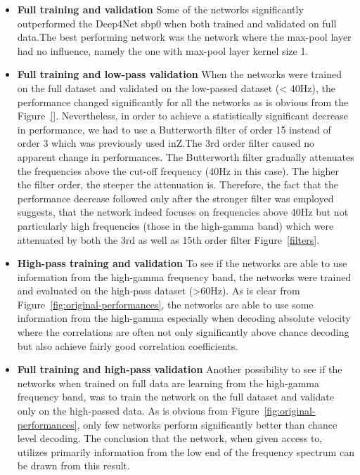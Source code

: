 \begin{itemize}
    \item \textbf{Full training and validation} Some of the networks significantly outperformed the Deep4Net sbp0 when both trained and validated on full data.The best performing network was the network where the max-pool layer had no influence, namely the one with max-pool layer kernel size 1.
    \item \textbf{Full training and low-pass validation} When the networks were trained on the full dataset and validated on the low-passed dataset (< 40Hz), the performance changed significantly for all the networks as is obvious from the Figure~\ref{}.
    Nevertheless, in order to achieve a statistically significant decrease in performance, we had to use a Butterworth filter of order 15 instead of order 3 which was previously used inZ\cite{Hammer-2021}.The 3rd order filter caused no apparent change in performances.
    The Butterworth filter gradually attenuates the frequencies above the cut-off frequency (40Hz in this case).
    The higher the filter order, the steeper the attenuation is.
    Therefore, the fact that the performance decrease followed only after the stronger filter was employed suggests, that the network indeed focuses on frequencies above 40Hz but not particularly high frequencies (those in the high-gamma band) which were attenuated by both the 3rd as well as 15th order filter Figure~\ref{filters}.
    \item \textbf{High-pass training and validation} To see if the networks are able to use information from the high-gamma frequency band, the networks were trained and evaluated on the high-pass dataset (>60Hz).
    As is clear from Figure~\ref{fig:original-performances}, the networks are able to use some information from the high-gamma especially when decoding absolute velocity where the correlations are often not only significantly above chance decoding but also achieve fairly good correlation coefficients.
    \item \textbf{Full training and high-pass validation} Another possibility to see if the networks when trained on full data are learning from the high-gamma frequency band, was to train the network on the full dataset and validate only on the high-passed data.
    As is obvious from Figure~\ref{fig:original-performances}, only few networks perform significantly better than chance level decoding. The conclusion that the network, when given access to, utilizes primarily information from the low end of the frequency spectrum can be drawn from this result.

\end{itemize}
